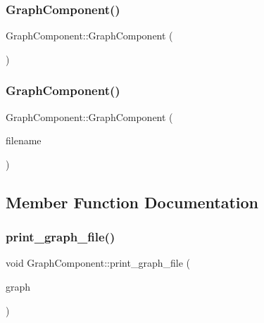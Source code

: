 \subsubsection{\texorpdfstring{Graph\+Component()}{GraphComponent()}\hspace{0.1cm}{\footnotesize\ttfamily [1/2]}}
{\footnotesize\ttfamily Graph\+Component\+::\+Graph\+Component (\begin{DoxyParamCaption}{ }\end{DoxyParamCaption})}

\mbox{\label{class_graph_component_a14482fdab4e309677b4a14ab8db13079}} 
\subsubsection{\texorpdfstring{Graph\+Component()}{GraphComponent()}\hspace{0.1cm}{\footnotesize\ttfamily [2/2]}}
{\footnotesize\ttfamily Graph\+Component\+::\+Graph\+Component (\begin{DoxyParamCaption}\item[{std\+::string}]{filename }\end{DoxyParamCaption})\hspace{0.3cm}{\ttfamily [inline]}}



\subsection{Member Function Documentation}
\mbox{\label{class_graph_component_a6af293dac3774fde0e2822b5725ecacd}} 
\subsubsection{\texorpdfstring{print\+\_\+graph\+\_\+file()}{print\_graph\_file()}}
{\footnotesize\ttfamily void Graph\+Component\+::print\+\_\+graph\+\_\+file (\begin{DoxyParamCaption}\item[{\hyperlink{class_graph_component_a982e0748a6e1b8dc74986f5f8b3dca5c}{the\+Graph} \&}]{graph }\end{DoxyParamCaption})}

